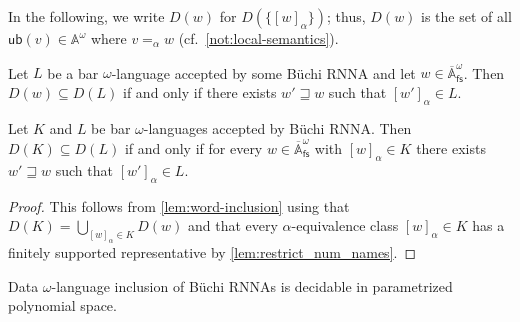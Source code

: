 \documentclass[10pt,a4paper]{amsart}
\newcommand{\barA}{\overline{\names}}
\newcommand{\ub}{\mathsf{ub}}
\numberwithin{equation}{section}
\newcommand{\seq}{\subseteq}
\newcommand{\fs}{\mathsf{fs}}
\newcommand{\+}[1]{\mathcal{#1}\xspace}
\newcommand{\names}{\mathbb{A}}
\theoremstyle{definition}
\begin{document}
\noindent In the following, we write $D(w)$ for $D(\{[w]_\alpha\})$; thus,
$D(w)$ is the set of all $\ub(v)\in \names^\omega$ where
$v=_\alpha w$ (cf.~\autoref{not:local-semantics}).
%
\begin{lemma}\label{lem:word-inclusion}
  Let $L$ be a bar $\omega$-language accepted by some Büchi RNNA and
  let $w\in \barA^\omega_\fs$. Then $D(w)\seq D(L)$ if and only if
  there exists $w'\sqsupseteq w$ such that $[w']_\alpha\in L$.
\end{lemma}
%

%
\begin{corollary}\label{cor:lang-inclusion}
  Let $K$ and $L$ be bar $\omega$-languages accepted by Büchi
  RNNA. Then $D(K)\seq D(L)$ if and only if for every
  $w\in \barA^\omega_\fs$ with $[w]_\alpha\in K$ there exists
  $w'\sqsupseteq w$ such that $[w']_\alpha\in L$.
\end{corollary}
%
\begin{proof}
  This follows from \autoref{lem:word-inclusion} using that
  $D(K)=\bigcup_{[w]_\alpha\in K} D(w)$ and that every
  $\alpha$-equivalence class $[w]_\alpha\in K$ has a finitely
  supported representative by \autoref{lem:restrict_num_names}.
\end{proof}
%

\begin{theorem}\label{thm:inclusion_decidable_local}
  Data $\omega$-language inclusion of Büchi RNNAs is decidable in parametrized
  polynomial space.
\end{theorem}
\end{document}
